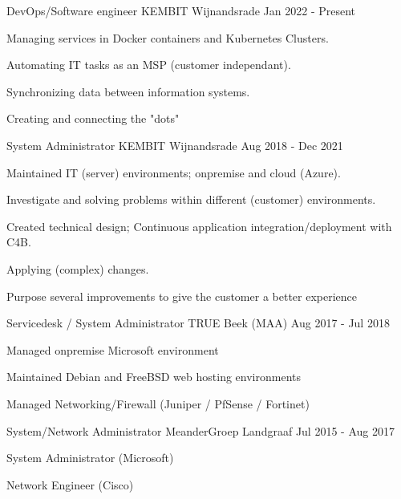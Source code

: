 \documentclass[11pt, letterpaper]{awesome-cv}
\begin{document}
\begin{cventries}


  \cventry
    {DevOps/Software engineer}
    {KEMBIT}
    {Wijnandsrade}
    {Jan 2022 - Present}
    {
      \begin{cvitems}
        \item{Managing services in Docker containers and Kubernetes Clusters.}
        \item{Automating IT tasks as an MSP (customer independant).}
        \item{Synchronizing data between information systems.}
        \item{Creating and connecting the "dots"}
      \end{cvitems}
    }


  \cventry
    {System Administrator}
    {KEMBIT}
    {Wijnandsrade}
    {Aug 2018 - Dec 2021}
    {
      \begin{cvitems}
        \item{Maintained IT (server) environments; onpremise and cloud (Azure).}
        \item{Investigate and solving problems within different (customer) environments.}
        \item{Created technical design; Continuous application integration/deployment with C4B.}
        \item{Applying (complex) changes.}
        \item{Purpose several improvements to give the customer a better experience}
      \end{cvitems}
    }


  \cventry
    {Servicedesk / System Administrator}
    {TRUE}
    {Beek (MAA)}
    {Aug 2017 - Jul 2018}
    {
      \begin{cvitems}
        \item{Managed onpremise Microsoft environment}
        \item{Maintained Debian and FreeBSD web hosting environments}
        \item{Managed Networking/Firewall (Juniper / PfSense / Fortinet)}
      \end{cvitems}
    }


  \cventry
    {System/Network Administrator}
    {MeanderGroep}
    {Landgraaf}
    {Jul 2015 - Aug 2017}
    {
      \begin{cvitems}
        \item{System Administrator (Microsoft)}
        \item{Network Engineer (Cisco)}
      \end{cvitems}
    }



\end{cventries}
\end{document}
